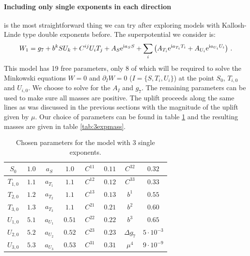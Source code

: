\documentclass[a4paper,12pt]{report}
\newcommand{\be}{\begin{equation}}
\newcommand{\ee}{\end{equation}}
\def\rmi{{\rm i}}
\def\rme{{\rm e}}
\begin{document}
\paragraph{Including only single exponents in each direction} is the most straightforward thing we can try after exploring models with Kallosh-Linde type double exponents before. The superpotential we consider is:
\be 
W_1 = g_7 + b^k S U_k + C^{ij} U_i T_j + A_S \rme^{\rmi a_S S} + \sum_i \left( A_{T_i} \rme^{\rmi a_{T_i}T_i} + A_{U_i} \rme^{\rmi a_{U_i}U_i} \right)\,.
\ee
This model has 19 free parameters, only 8 of which will be required to solve the Minkowski equations $W = 0$ and $\partial_I W = 0$ ($I = \{S, T_i, U_i \}$) at the point $S_0$, $T_{i,0}$ and $U_{i,0}$. We choose to solve for the $A_I$ and $g_7$. The remaining parameters can be used to make sure all masses are positive. The uplift proceeds along the same lines as was discussed in the previous sections with the magnitude of the uplift given by $\mu$. Our choice of parameters can be found in table \ref{tab:3exppara} and the resulting masses are given in table \ref{tab:3expmass}.
\begin{table}[htb]
\center
\begin{tabular}{|c|c||c|c||c|c||c|c|}\hline
 $\,S_0\,$     & $1.0$   & $\,a_S\,$ & $\;1.0\,$ &$\,C^{11}\,$ & $\,0.11\,$ &  $\,C^{32}\,$ & $\,0.32\,$\\\hline
 $T_{1,0}$ & $\,1.1\,$ & $\,a_{T_1}\,$ & $\;1.1\,$ & $C^{12}$ & $0.12$ & $C^{33}$ & $0.33$ \\\hline
 $T_{2,0}$ & $1.2$ & $\,a_{T_2}\,$ & $\;1.1\,$ & $C^{13}$ & $0.13$ & $b^1$     & $0.55$\\\hline
 $T_{3,0}$ & $1.3$ & $\,a_{T_3}\,$ & $\;1.1\,$ & $C^{21}$ & $0.21$ & $b^2$     & $0.60$  \\\hline
 $U_{1,0}$ & $5.1$ & $\,a_{U_1}\,$ & $\;0.51\,$ & $C^{22}$ & $0.22$ & $b^3$     & $0.65$ \\\hline
 $U_{2,0}$ & $5.2$ & $\,a_{U_2}\,$ & $\;0.52\,$ & $C^{23}$ & $0.23$ & $\Delta g_7$ & $5 \cdot 10^{-3} $ \\\hline
 $U_{3,0}$ & $5.3$ & $\,a_{U_3}\,$ & $\;0.53\,$ & $C^{31}$ & $0.31$ & $\mu^4$ & $ 9 \cdot 10^{-9} $ \\\hline
\end{tabular}
\caption{Chosen parameters for the model with 3 single exponents.}
\label{tab:3exppara}
\end{table}
\end{document}
